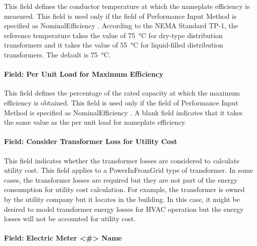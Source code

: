 This field defines the conductor temperature at which the nameplate efficiency is measured. This field is used only if the field of Performance Input Method is specified as NominalEfficiency . According to the NEMA Standard TP-1, the reference temperature takes the value of \SI{75}{\celsius} for dry-type distribution transformers and it takes the value of \SI{55}{\celsius} for liquid-filled distribution transformers. The default is \SI{75}{\celsius}.

\paragraph{Field: Per Unit Load for Maximum Efficiency}\label{field-per-unit-load-for-maximum-efficiency}

This field defines the percentage of the rated capacity at which the maximum efficiency is obtained. This field is used only if the field of Performance Input Method is specified as NominalEfficiency . A blank field indicates that it takes the same value as the per unit load for nameplate efficiency.

\paragraph{Field: Consider Transformer Loss for Utility Cost}\label{field-consider-transformer-loss-for-utility-cost}

This field indicates whether the transformer losses are considered to calculate utility cost. This field applies to a PowerInFromGrid type of transformer. In some cases, the transformer losses are required but they are not part of the energy consumption for utility cost calculation. For example, the transformer is owned by the utility company but it locates in the building. In this case, it might be desired to model transformer energy losses for HVAC operation but the energy losses will not be accounted for utility cost.

\paragraph{Field: Electric Meter \textless{}\#\textgreater{} Name}\label{field-electric-meter-1-10-name}

